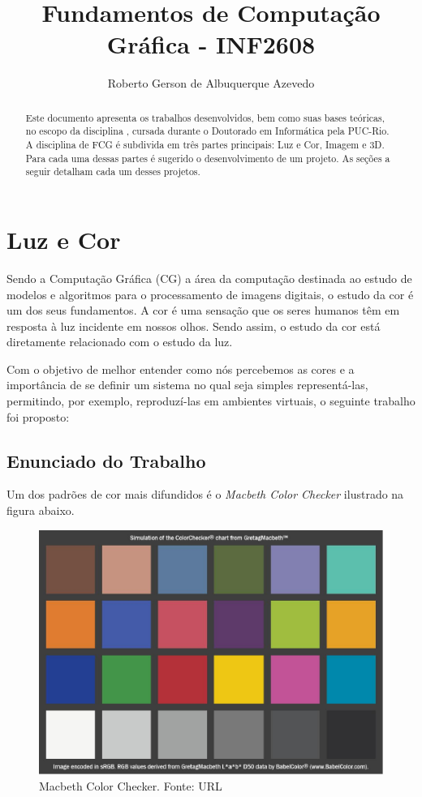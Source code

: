 \documentclass[a4paper,10pt]{report}
\title{Fundamentos de Computação Gráfica - INF2608}
\author{Roberto Gerson de Albuquerque Azevedo}
\begin{document}
\maketitle

\begin{abstract}
Este documento apresenta os trabalhos desenvolvidos, bem como suas bases
teóricas, no escopo da disciplina , cursada
durante o Doutorado em Informática pela PUC-Rio. A disciplina de FCG é subdivida
em três partes principais: Luz e Cor, Imagem e 3D. Para cada uma dessas partes é
sugerido o desenvolvimento de um projeto. As seções a seguir detalham cada um
desses projetos.
\end{abstract}

\chapter{Luz e Cor}
\par
Sendo a Computação Gráfica (CG) a área da computação destinada ao estudo de
modelos e algoritmos para o processamento de imagens digitais, o estudo da cor é
um dos seus fundamentos. A cor é uma sensação que os seres humanos têm em
resposta à luz incidente em nossos olhos. Sendo assim, o estudo da cor está
diretamente relacionado com o estudo da luz.

\par
Com o objetivo de melhor entender como nós percebemos as cores e a importância
de se definir um sistema no qual seja simples representá-las, permitindo, por
exemplo, reproduzí-las em ambientes virtuais, o seguinte trabalho foi proposto:

\section{Enunciado do Trabalho}
\par
Um dos padrões de cor mais difundidos é o \textit{Macbeth Color Checker}
ilustrado na figura abaixo.

\begin{figure}[!htb]
     \centering
     \includegraphics[scale=0.4]{img/colorChecker.jpg}
     \caption{Macbeth Color Checker. Fonte: URL}
     \label{Label de referência para a imagem}
\end{figure}
\end{document}
